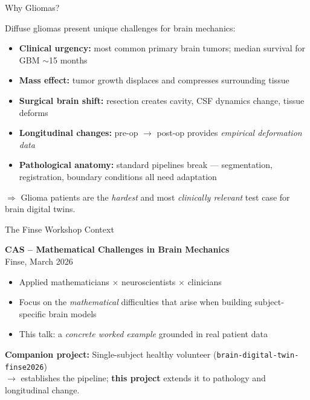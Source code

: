 \begin{frame}{Why Gliomas?}

  Diffuse gliomas present unique challenges for brain mechanics:

  \bigskip

  \begin{itemize}
    \item \textbf{Clinical urgency:} most common primary brain tumors;
      median survival for GBM $\sim$15 months
    \item \textbf{Mass effect:} tumor growth displaces and compresses
      surrounding tissue \cite{Zarodniuk2026}
    \item \textbf{Surgical brain shift:} resection creates cavity,
      CSF dynamics change, tissue deforms
    \item \textbf{Longitudinal changes:} pre-op $\to$ post-op provides
      \emph{empirical deformation data}
    \item \textbf{Pathological anatomy:} standard pipelines break ---
      segmentation, registration, boundary conditions all need adaptation
  \end{itemize}

  \bigskip
  \alert{$\Rightarrow$} Glioma patients are the \emph{hardest} and most
  \emph{clinically relevant} test case for brain digital twins.

\end{frame}

\begin{frame}{The Finse Workshop Context}

  \textbf{CAS -- Mathematical Challenges in Brain Mechanics}\\
  Finse, March 2026

  \bigskip

  \begin{itemize}
    \item Applied mathematicians $\times$ neuroscientists $\times$
      clinicians
    \item Focus on the \emph{mathematical} difficulties that arise when
      building subject-specific brain models
    \item This talk: a \emph{concrete worked example} grounded in real
      patient data
  \end{itemize}

  \bigskip

  \textbf{Companion project:} Single-subject healthy volunteer
  (\texttt{brain-digital-twin-finse2026})\\
  $\to$ establishes the pipeline; \textbf{this project} extends it to
  pathology and longitudinal change.

\end{frame}


